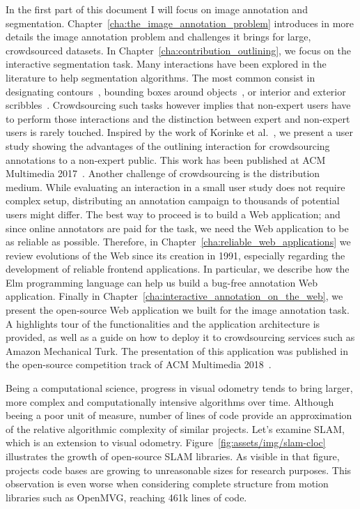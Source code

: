 In the first part of this document I will focus on image annotation and segmentation.
Chapter~\ref{cha:the_image_annotation_problem} introduces in more details
the image annotation problem and challenges it brings for large, crowdsourced datasets.
In Chapter~\ref{cha:contribution_outlining}, we focus on the interactive segmentation task.
Many interactions have been explored in the literature to help segmentation algorithms.
The most common consist in designating contours~\cite{russell2008labelme},
bounding boxes around objects~\cite{rother_grabcut:_2004},
or interior and exterior scribbles~\cite{mcguinness2010comparative}.
Crowdsourcing such tasks however implies that non-expert users have to perform
those interactions and the distinction between expert and non-expert users is rarely touched.
Inspired by the work of Korinke et al.~\cite{korinke_intuitive_2015, korinke_exploring_2015},
we present a user study showing the advantages of the outlining interaction
for crowdsourcing annotations to a non-expert public.
This work has been published at ACM Multimedia 2017~\cite{pizenberg2017outlining}.
Another challenge of crowdsourcing is the distribution medium.
While evaluating an interaction in a small user study does not require complex setup,
distributing an annotation campaign to thousands of potential users might differ.
The best way to proceed is to build a Web application;
and since online annotators are paid for the task,
we need the Web application to be as reliable as possible.
Therefore, in Chapter~\ref{cha:reliable_web_applications} we review evolutions of the Web
since its creation in 1991, especially regarding the development
of reliable frontend applications.
In particular, we describe how the Elm programming language can help us
build a bug-free annotation Web application.
Finally in Chapter~\ref{cha:interactive_annotation_on_the_web},
we present the open-source Web application we built for the image annotation task.
A highlights tour of the functionalities and the application architecture is provided,
as well as a guide on how to deploy it to crowdsourcing services
such as Amazon Mechanical Turk.
The presentation of this application was published in the open-source competition track
of ACM Multimedia 2018~\cite{pizenberg2018annotation}.


Being a computational science, progress in visual odometry tends to bring larger,
more complex and computationally intensive algorithms over time.
Although beeing a poor unit of measure, number of lines of code provide
an approximation of the relative algorithmic complexity of similar projects.
Let's examine SLAM, which is an extension to visual odometry.
Figure~\ref{fig:assets/img/slam-cloc} illustrates the growth of open-source SLAM libraries.
As visible in that figure, projects code bases are growing to unreasonable sizes for research purposes.
This observation is even worse when considering complete structure from motion
libraries such as OpenMVG, reaching 461k lines of code.

